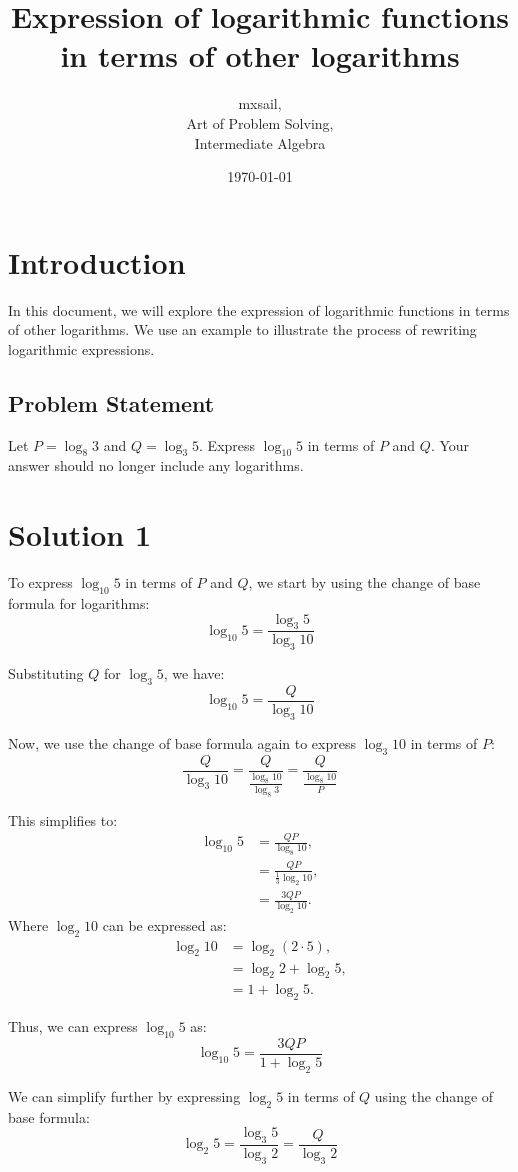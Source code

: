 \documentclass{article}
\title{Expression of logarithmic functions in terms of other logarithms}
\author{mxsail,\\ Art of Problem Solving,\\ Intermediate Algebra}
\date{\today}
\begin{document}
\maketitle

\section*{Introduction}
In this document, we will explore the expression of logarithmic functions in terms of other logarithms. We use an example to illustrate the process of rewriting logarithmic expressions.

\subsection*{Problem Statement}
Let $P = \log_8 3$ and $Q = \log_3 5$. Express $\log_{10} 5$ in terms of $P$ and $Q$. Your answer should no longer include any logarithms.

\section*{Solution 1}
To express $\log_{10} 5$ in terms of $P$ and $Q$, we start by using the change of base formula for logarithms:
\[
\log_{10} 5 = \frac{\log_3 5}{\log_3 10}
\]

Substituting $Q$ for $\log_3 5$, we have:
\[
\log_{10} 5 = \frac{Q}{\log_3 10}
\]

Now, we use the change of base formula again to express $\log_3 10$ in terms of $P$:
\[
\frac{Q}{\log_3 10} = \frac{Q}{\frac{\log_8 10}{\log_8 3}} = \frac{Q}{\frac{\log_8 10}{P}}
\]

This simplifies to:
\begin{align*}
    \log_{10} 5 &= \frac{QP}{\log_8 10}, \\
    &= \frac{QP}{\frac{1}{3} \log_2 10}, \\
    &= \frac{3QP}{\log_2 10}.
\end{align*}
Where $\log_2 10$ can be expressed as:
\begin{align*}
    \log_2 10 &= \log_2 (2 \cdot 5), \\
    &= \log_2 2 + \log_2 5, \\
    &= 1 + \log_2 5.
\end{align*}

Thus, we can express $\log_{10} 5$ as:
\[
\log_{10} 5 = \frac{3QP}{1 + \log_2 5}
\]

We can simplify further by expressing $\log_2 5$ in terms of $Q$ using the change of base formula:
\[
\log_2 5 = \frac{\log_3 5}{\log_3 2} = \frac{Q}{\log_3 2}
\]
\end{document}
